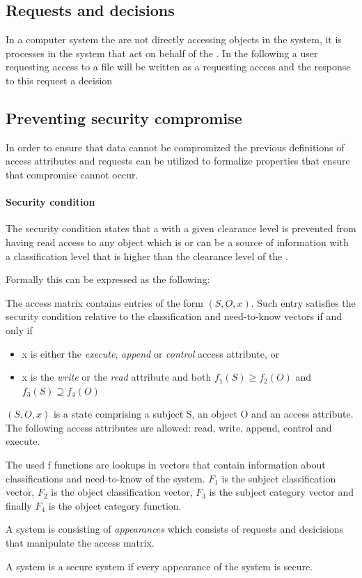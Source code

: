 \subsection{Requests and decisions}
In a computer system the \principals{} are not directly accessing objects in the system, it is processes in the system that act on behalf of the \principal{}.
In the following a user requesting access to a file will be written as a \principal{} requesting access and the response to this request a decision

\subsection{Preventing security compromise}\label{bellap:properties}
In order to ensure that data cannot be compromized the previous definitions of access attributes and requests can be utilized to formalize properties that ensure that compromise cannot occur.

\paragraph{Security condition}
The security condition states that a \principal{} with a given clearance level is prevented from having read access to any object which is or can be a source of information with a classification level that is higher than the clearance level of the \principal{}.

Formally this can be expressed as the following:
\begin{definition}
The access matrix contains entries of the form $(S,O,x)$.
 Such entry satisfies the security condition relative to the classification and need-to-know vectors if and only if

\begin{itemize}
\item x is either the \emph{execute}, \emph{append} or \emph{control} access attribute, or
\item x is the \emph{write} or the \emph{read} attribute and both $f_1(S) \ge f_2(O)$ and $f_3(S) \supseteq f_4(O)$
\end{itemize}

 $(S,O,x)$ is a state comprising a subject S, an object O and an access attribute.
 The following access attributes are allowed: read, write, append, control and execute.

 The used f functions are lookups in vectors that contain information about classifications and need-to-know of the system.
 $F_1$ is the subject classification vector, $F_2$ is the object classification vector, $F_3$ is the subject category vector and finally $F_4$ is the object category function.

A system is consisting of \emph{appearances} which consists of requests and desicisions that manipulate the access matrix.

A system is a secure system if every appearance of the system is secure.
\end{definition}

